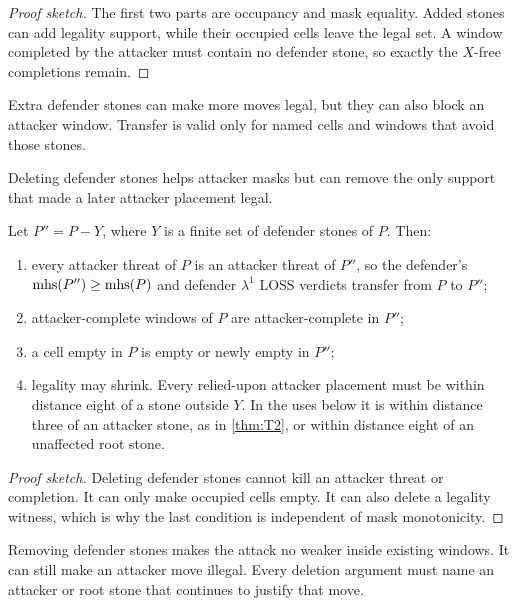 \begin{proof}[Proof sketch]
The first two parts are occupancy and mask equality.  Added stones can add
legality support, while their occupied cells leave the legal set.  A window
completed by the attacker must contain no defender stone, so exactly the
$X$-free completions remain.
\end{proof}

\begin{plainterms}
Extra defender stones can make more moves legal, but they can also block an
attacker window.  Transfer is valid only for named cells and windows that
avoid those stones.
\end{plainterms}

Deleting defender stones helps attacker masks but can remove the only support
that made a later attacker placement legal.

\begin{lemma}
\label{lem:L6}
Let $P''=P-Y$, where $Y$ is a finite set of defender stones of $P$.  Then:
\begin{enumerate}[label=\textup{(\alph*)}]
  \item every attacker threat of $P$ is an attacker threat of $P''$, so the
  defender's $\operatorname{mhs}(P'')\ge\operatorname{mhs}(P)$ and defender $\lambda^1$ LOSS verdicts
  transfer from $P$ to $P''$;
  \item attacker-complete windows of $P$ are attacker-complete in $P''$;
  \item a cell empty in $P$ is empty or newly empty in $P''$;
  \item legality may shrink.  Every relied-upon attacker placement must be
  within distance eight of a stone outside $Y$.  In the uses below it is
  within distance three of an attacker stone, as in \cref{thm:T2}, or within
  distance eight of an unaffected root stone.
\end{enumerate}
\end{lemma}

\begin{proof}[Proof sketch]
Deleting defender stones cannot kill an attacker threat or completion.  It
can only make occupied cells empty.  It can also delete a legality witness,
which is why the last condition is independent of mask monotonicity.
\end{proof}

\begin{plainterms}
Removing defender stones makes the attack no weaker inside existing windows.
It can still make an attacker move illegal.  Every deletion argument must name
an attacker or root stone that continues to justify that move.
\end{plainterms}

